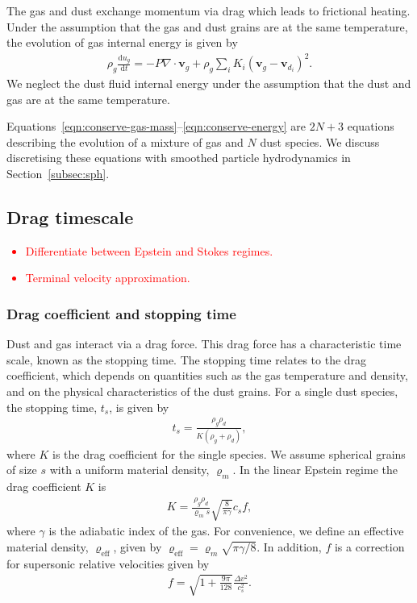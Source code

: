 \documentclass[fleqn,usenatbib]{mnras}
\newcommand{\dd}{\mathrm{d}}
\let\vec\mathbf
\begin{document}
The gas and dust exchange momentum via drag which leads to frictional heating.
Under the assumption that the gas and dust grains are at the same temperature,
the evolution of gas internal energy is given by
%
\begin{align}
   \label{eqn:conserve-energy}
   \rho_g \frac{\dd u_g}{\dd t} =
      - P \nabla \cdot \vec{v}_g + \rho_g \sum_i K_i {(\vec{v}_g - \vec{v}_{d_i})}^2.
\end{align}
%
We neglect the dust fluid internal energy under the assumption that the dust and
gas are at the same temperature.

Equations~\ref{eqn:conserve-gas-mass}--\ref{eqn:conserve-energy} are \(2N + 3\)
equations describing the evolution of a mixture of gas and \(N\) dust species.
We discuss discretising these equations with smoothed particle hydrodynamics in
Section~\ref{subsec:sph}.

\subsection{Drag timescale}

\textcolor{red}{
\begin{itemize}
   \item Differentiate between Epstein and Stokes regimes.
   \item Terminal velocity approximation.
\end{itemize}
}

\subsubsection{Drag coefficient and stopping time}

Dust and gas interact via a drag force. This drag force has a characteristic
time scale, known as the stopping time. The stopping time relates to the drag
coefficient, which depends on quantities such as the gas temperature and
density, and on the physical characteristics of the dust grains. For a single
dust species, the stopping time, \(t_s\), is given by
%
\begin{align}
   \label{eqn:single-stopping-time}
   t_s = \frac{\rho_g \rho_d}{K (\rho_g + \rho_d)},
\end{align}
%
where \(K\) is the drag coefficient for the single species. We assume spherical
grains of size \(s\) with a uniform material density, \(\varrho_m\). In the
linear Epstein regime \citep{Epstein1924PhRv...23..710E} the drag coefficient
\(K\) is
%
\begin{align}
   \label{eqn:single-drag-coefficient}
   K = \frac{\rho_g \rho_d}{\varrho_m s} \sqrt{\frac{8}{\pi\gamma}} c_s f,
\end{align}
%
where \(\gamma\) is the adiabatic index of the gas. For convenience, we define
an effective material density, \(\varrho_{\mathrm{eff}}\), given by
\(\varrho_{\mathrm{eff}} = \varrho_m \sqrt{\pi\gamma/8}\). In addition, \(f\) is
a correction for supersonic relative velocities given by
\citep{Kwok1975ApJ...198..583K}
%
\begin{align}
   \label{eqn:supersonic}
   f = \sqrt{1 + \frac{9\pi}{128}} \frac{\Delta v^2}{c_s^2}.
\end{align}
%
\end{document}
